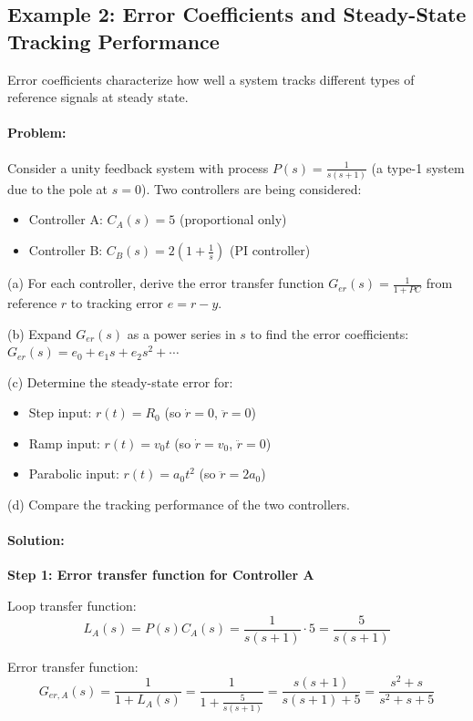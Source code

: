 \documentclass[11pt,a4paper]{article}
\begin{document}
\subsection{Example 2: Error Coefficients and Steady-State Tracking Performance}

Error coefficients characterize how well a system tracks different types of reference signals at steady state.

\paragraph{Problem:}
Consider a unity feedback system with process $P(s) = \frac{1}{s(s+1)}$ (a type-1 system due to the pole at $s=0$). Two controllers are being considered:
\begin{itemize}
\item Controller A: $C_A(s) = 5$ (proportional only)
\item Controller B: $C_B(s) = 2(1 + \frac{1}{s})$ (PI controller)
\end{itemize}

(a) For each controller, derive the error transfer function $G_{er}(s) = \frac{1}{1+PC}$ from reference $r$ to tracking error $e = r - y$.

(b) Expand $G_{er}(s)$ as a power series in $s$ to find the error coefficients: $G_{er}(s) = e_0 + e_1 s + e_2 s^2 + \cdots$

(c) Determine the steady-state error for:
\begin{itemize}
\item Step input: $r(t) = R_0$ (so $\dot{r} = 0$, $\ddot{r} = 0$)
\item Ramp input: $r(t) = v_0 t$ (so $\dot{r} = v_0$, $\ddot{r} = 0$)
\item Parabolic input: $r(t) = a_0 t^2$ (so $\ddot{r} = 2a_0$)
\end{itemize}

(d) Compare the tracking performance of the two controllers.

\paragraph{Solution:}

\textbf{Step 1: Error transfer function for Controller A}

Loop transfer function:
\[
L_A(s) = P(s)C_A(s) = \frac{1}{s(s+1)} \cdot 5 = \frac{5}{s(s+1)}
\]

Error transfer function:
\[
G_{er,A}(s) = \frac{1}{1+L_A(s)} = \frac{1}{1 + \frac{5}{s(s+1)}} = \frac{s(s+1)}{s(s+1) + 5} = \frac{s^2 + s}{s^2 + s + 5}
\]
\end{document}
